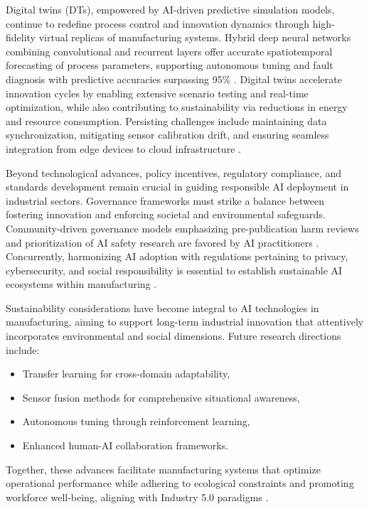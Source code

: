 \documentclass[11pt]{article}
\begin{document}
Digital twins (DTs), empowered by AI-driven predictive simulation models, continue to redefine process control and innovation dynamics through high-fidelity virtual replicas of manufacturing systems. Hybrid deep neural networks combining convolutional and recurrent layers offer accurate spatiotemporal forecasting of process parameters, supporting autonomous tuning and fault diagnosis with predictive accuracies surpassing 95\% \cite{ref26}. Digital twins accelerate innovation cycles by enabling extensive scenario testing and real-time optimization, while also contributing to sustainability via reductions in energy and resource consumption. Persisting challenges include maintaining data synchronization, mitigating sensor calibration drift, and ensuring seamless integration from edge devices to cloud infrastructure \cite{ref26,ref38}.

Beyond technological advances, policy incentives, regulatory compliance, and standards development remain crucial in guiding responsible AI deployment in industrial sectors. Governance frameworks must strike a balance between fostering innovation and enforcing societal and environmental safeguards. Community-driven governance models emphasizing pre-publication harm reviews and prioritization of AI safety research are favored by AI practitioners \cite{ref45}. Concurrently, harmonizing AI adoption with regulations pertaining to privacy, cybersecurity, and social responsibility is essential to establish sustainable AI ecosystems within manufacturing \cite{ref44}.

Sustainability considerations have become integral to AI technologies in manufacturing, aiming to support long-term industrial innovation that attentively incorporates environmental and social dimensions. Future research directions include:
\begin{itemize}
    \item Transfer learning for cross-domain adaptability,
    \item Sensor fusion methods for comprehensive situational awareness,
    \item Autonomous tuning through reinforcement learning,
    \item Enhanced human-AI collaboration frameworks.
\end{itemize}
Together, these advances facilitate manufacturing systems that optimize operational performance while adhering to ecological constraints and promoting workforce well-being, aligning with Industry 5.0 paradigms \cite{ref5,ref7,ref44}.
\end{document}
